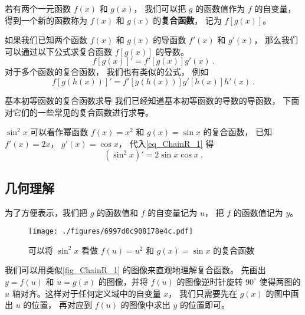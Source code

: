 
若有两个一元函数 $f(x)$ 和 $g(x)$， 我们可以把 $g$ 的函数值作为 $f$ 的自变量， 得到一个新的函数称为 $f(x)$ 和 $g(x)$ 的\textbf{复合函数}， 记为 $f[g(x)]$。

如果我们已知两个函数 $f(x)$ 和 $g(x)$ 的导函数 $f'(x)$ 和 $g'(x)$， 那么我们可以通过以下公式求复合函数 $f[g(x)]$ 的导数。
\begin{equation}\label{eq_ChainR_1}
f[g(x)]' = f'[g(x)]g'(x)~.
\end{equation}
对于多个函数的复合函数， 我们也有类似的公式， 例如
\begin{equation}
f[g(h(x))]' = f'[g(h(x))]g'[h(x)]h'(x)~.
\end{equation}

\begin{example}{基本初等函数的复合函数求导}
我们已经知道基本初等函数的导数的导函数， 下面对它们的一些常见的复合函数进行求导。

$\sin^2 x$ 可以看作幂函数 $f(x) = x^2$ 和 $g(x) = \sin x$ 的复合函数， 已知 $f'(x) = 2x$， $g'(x) = \cos x$， 代入\autoref{eq_ChainR_1} 得
\begin{equation}
(\sin^2 x)' = 2\sin x \cos x~.
\end{equation}

\end{example}

\subsection{几何理解}
为了方便表示，我们把 $g$ 的函数值和 $f$ 的自变量记为 $u$， 把 $f$ 的函数值记为 $y$。

\begin{figure}[ht]
\centering
\texttt{[image: ./figures/6997d0c908178e4c.pdf]}
\caption{可以将 $\sin^2 x$ 看做 $f(u) = u^2$ 和 $g(x) = \sin x$ 的复合函数}\label{fig_ChainR_1}
\end{figure}

我们可以用类似\autoref{fig_ChainR_1} 的图像来直观地理解复合函数。 先画出 $y = f(u)$ 和 $u = g(x)$ 的图像，并将 $f(u)$ 的图像逆时针旋转 $90^\circ$ 使得两图的 $u$ 轴对齐。这样对于任何定义域中的自变量 $x$， 我们只需要先在 $g(x)$ 的图中画出 $u$ 的位置， 再对应到 $f(u)$ 的图像中求出 $y$ 的位置即可。 

